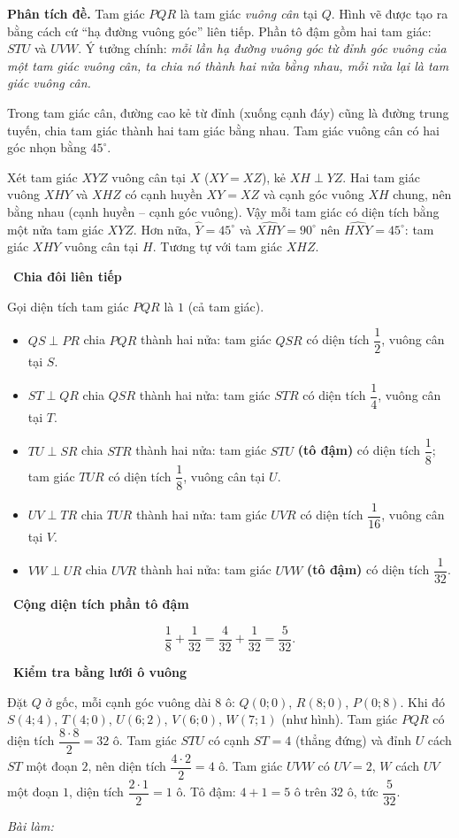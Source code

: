 \documentclass[11pt]{article}
\newif\ifsol \solfalse
\newcommand{\probsol}[1]{%
  \begin{lrbox}{\solmeasure}\begin{minipage}{\dimexpr\linewidth-24pt\relax}#1\end{minipage}\end{lrbox}%
  \ifsol
    \begin{solbox}#1\end{solbox}%
  \else
    \setlength{\solht}{\dimexpr\ht\solmeasure+\dp\solmeasure+0.85cm\relax}%
    \ifdim\solht<1.35cm\setlength{\solht}{1.35cm}\fi
    \ifdim\solht>\StudentMaxWork\setlength{\solht}{\StudentMaxWork}\fi
    \begin{tcolorbox}[colback=white,colframe=Line,boxrule=0.8pt,arc=5pt,
      left=8pt,right=8pt,top=4pt,bottom=4pt,height=\solht]{\footnotesize\color{Slate}\itshape\WorkWord}\end{tcolorbox}%
  \fi}
\newlength{\StudentMaxWork}\setlength{\StudentMaxWork}{7.5cm}
\newcommand{\step}[2]{\par\smallskip\noindent{\bfseries\color{tmBlue!85!black}\StepWord~#1.}\ {\bfseries #2}\par\nopagebreak}
\def\WorkWord{Bài làm:}
\def\StepWord{Bước}
\begin{document}
\probsol{
\textbf{Phân tích đề.} Tam giác $PQR$ là tam giác \emph{vuông cân} tại $Q$. Hình vẽ được tạo ra bằng cách cứ ``hạ đường vuông góc'' liên tiếp. Phần tô đậm gồm hai tam giác: $STU$ và $UVW$. Ý tưởng chính: \emph{mỗi lần hạ đường vuông góc từ đỉnh góc vuông của một tam giác vuông cân, ta chia nó thành hai nửa bằng nhau, mỗi nửa lại là tam giác vuông cân.}

\begin{recallbox}Trong tam giác cân, đường cao kẻ từ đỉnh (xuống cạnh đáy) cũng là đường trung tuyến, chia tam giác thành hai tam giác bằng nhau. Tam giác vuông cân có hai góc nhọn bằng $45^\circ$.\end{recallbox}

\begin{proofbox}Xét tam giác $XYZ$ vuông cân tại $X$ ($XY=XZ$), kẻ $XH\perp YZ$. Hai tam giác vuông $XHY$ và $XHZ$ có cạnh huyền $XY=XZ$ và cạnh góc vuông $XH$ chung, nên bằng nhau (cạnh huyền -- cạnh góc vuông). Vậy mỗi tam giác có diện tích bằng một nửa tam giác $XYZ$. Hơn nữa, $\widehat{Y}=45^\circ$ và $\widehat{XHY}=90^\circ$ nên $\widehat{HXY}=45^\circ$: tam giác $XHY$ vuông cân tại $H$. Tương tự với tam giác $XHZ$.\end{proofbox}

\step{1}{Chia đôi liên tiếp}
Gọi diện tích tam giác $PQR$ là $1$ (cả tam giác).
\begin{itemize}[leftmargin=1.4em,itemsep=1pt]
\item $QS\perp PR$ chia $PQR$ thành hai nửa: tam giác $QSR$ có diện tích $\dfrac12$, vuông cân tại $S$.
\item $ST\perp QR$ chia $QSR$ thành hai nửa: tam giác $STR$ có diện tích $\dfrac14$, vuông cân tại $T$.
\item $TU\perp SR$ chia $STR$ thành hai nửa: tam giác $STU$ \textbf{(tô đậm)} có diện tích $\dfrac18$; tam giác $TUR$ có diện tích $\dfrac18$, vuông cân tại $U$.
\item $UV\perp TR$ chia $TUR$ thành hai nửa: tam giác $UVR$ có diện tích $\dfrac1{16}$, vuông cân tại $V$.
\item $VW\perp UR$ chia $UVR$ thành hai nửa: tam giác $UVW$ \textbf{(tô đậm)} có diện tích $\dfrac1{32}$.
\end{itemize}

\step{2}{Cộng diện tích phần tô đậm}
\[\frac18+\frac1{32}=\frac{4}{32}+\frac{1}{32}=\frac{5}{32}.\]

\step{3}{Kiểm tra bằng lưới ô vuông}
Đặt $Q$ ở gốc, mỗi cạnh góc vuông dài $8$ ô: $Q(0;0)$, $R(8;0)$, $P(0;8)$. Khi đó $S(4;4)$, $T(4;0)$, $U(6;2)$, $V(6;0)$, $W(7;1)$ (như hình). Tam giác $PQR$ có diện tích $\dfrac{8\cdot 8}{2}=32$ ô. Tam giác $STU$ có cạnh $ST=4$ (thẳng đứng) và đỉnh $U$ cách $ST$ một đoạn $2$, nên diện tích $\dfrac{4\cdot 2}{2}=4$ ô. Tam giác $UVW$ có $UV=2$, $W$ cách $UV$ một đoạn $1$, diện tích $\dfrac{2\cdot1}{2}=1$ ô. Tô đậm: $4+1=5$ ô trên $32$ ô, tức $\dfrac5{32}$.

}
\end{document}
